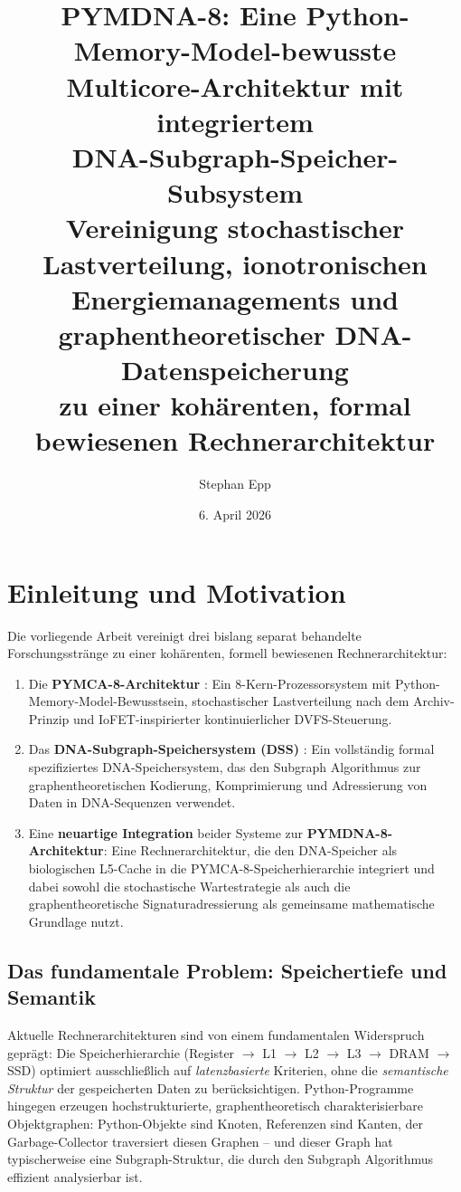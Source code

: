 ﻿\documentclass[a4paper,12pt]{article}
\title{\textbf{PYMDNA-8: Eine Python-Memory-Model-bewusste\\
    Multicore-Architektur mit integriertem\\
    DNA-Subgraph-Speicher-Subsystem}\\[0.5em]
  \large Vereinigung stochastischer Lastverteilung, ionotronischen\\
  Energiemanagements und graphentheoretischer DNA-Datenspeicherung\\
  zu einer kohärenten, formal bewiesenen Rechnerarchitektur}
\author{Stephan Epp}
\date{6. April 2026}
\theoremstyle{definition}
\begin{document}

\maketitle
\tableofcontents
\newpage

\section{Einleitung und Motivation}

Die vorliegende Arbeit vereinigt drei bislang separat behandelte Forschungsstränge
zu einer kohärenten, formell bewiesenen Rechnerarchitektur:

\begin{enumerate}[noitemsep]
  \item Die \textbf{PYMCA-8-Architektur} \cite{epp2026pymca8}: Ein
    8-Kern-Prozessorsystem mit Python-Memory-Model-Bewusstsein, stochastischer
    Lastverteilung nach dem Archiv-Prinzip und IoFET-inspirierter kontinuierlicher
    DVFS-Steuerung.
  \item Das \textbf{DNA-Subgraph-Speichersystem (DSS)} \cite{epp2026dnastor}:
    Ein vollständig formal spezifiziertes DNA-Speichersystem, das den Subgraph
    Algorithmus \cite{epp2026subgraph} zur graphentheoretischen Kodierung,
    Komprimierung und Adressierung von Daten in DNA-Sequenzen verwendet.
  \item Eine \textbf{neuartige Integration} beider Systeme zur
    \textbf{PYMDNA-8-Architektur}: Eine Rechnerarchitektur, die den
    DNA-Speicher als biologischen L5-Cache in die PYMCA-8-Speicherhierarchie
    integriert und dabei sowohl die stochastische Wartestrategie als auch
    die graphentheoretische Signaturadressierung als gemeinsame mathematische
    Grundlage nutzt.
\end{enumerate}

\subsection{Das fundamentale Problem: Speichertiefe und Semantik}

Aktuelle Rechnerarchitekturen sind von einem fundamentalen Widerspruch geprägt:
Die Speicherhierarchie (Register $\to$ L1 $\to$ L2 $\to$ L3 $\to$ DRAM $\to$ SSD)
optimiert ausschließlich auf \emph{latenzbasierte} Kriterien, ohne die
\emph{semantische Struktur} der gespeicherten Daten zu berücksichtigen.
Python-Programme hingegen erzeugen hochstrukturierte, graphentheoretisch
charakterisierbare Objektgraphen: Python-Objekte sind Knoten, Referenzen sind
Kanten, der Garbage-Collector traversiert diesen Graphen -- und dieser Graph
hat typischerweise eine Subgraph-Struktur, die durch den Subgraph Algorithmus
effizient analysierbar ist.
\end{document}
